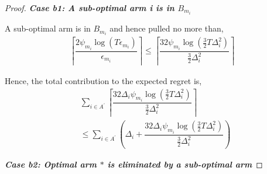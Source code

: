 \begin{proof}
\textbf{\textit{Case b1: A sub-optimal arm i is in $B_{m_i}$}}


A sub-optimal arm is in $B_{m_i}$ and hence pulled no more than,
\begin{align*}
\left\lceil \dfrac{2\psi_{m_i}\log( T\epsilon_{m_i})}{\epsilon_{m_i}} \right\rceil\leq \left\lceil \dfrac{32\psi_{m_i}\log( \frac{3}{2} T\Delta_i^2)}{\frac{3}{2} \Delta_i^2}\right\rceil
\end{align*}

Hence, the total contribution to the expected regret is,
\begin{align*}
&\sum_{i\in A^{'}} \left\lceil \dfrac{32\Delta_i\psi_{m_i}\log( \frac{3}{2} T\Delta_i^2)}{\frac{3}{2} \Delta_i^2}\right\rceil\\
&\leq \sum_{i\in A^{'}} \left( \Delta_i +\dfrac{32\Delta_i\psi_{m_i}\log( \frac{3}{2} T\Delta_i^2)}{\frac{3}{2} \Delta_i^2}\right)
\end{align*}

\textbf{\textit{Case b2: Optimal arm ${*}$ is eliminated by a sub-optimal arm}}


\end{proof}
